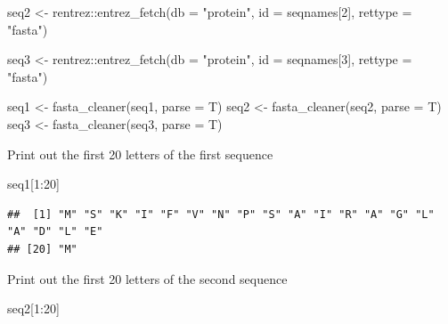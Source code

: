 \documentclass[
]{book}
\newenvironment{Shaded}{\begin{snugshade}}{\end{snugshade}}
\newcommand{\AttributeTok}[1]{\textcolor[rgb]{0.77,0.63,0.00}{#1}}
\newcommand{\DecValTok}[1]{\textcolor[rgb]{0.00,0.00,0.81}{#1}}
\newcommand{\FunctionTok}[1]{\textcolor[rgb]{0.00,0.00,0.00}{#1}}
\newcommand{\NormalTok}[1]{#1}
\newcommand{\OtherTok}[1]{\textcolor[rgb]{0.56,0.35,0.01}{#1}}
\newcommand{\SpecialCharTok}[1]{\textcolor[rgb]{0.00,0.00,0.00}{#1}}
\newcommand{\StringTok}[1]{\textcolor[rgb]{0.31,0.60,0.02}{#1}}
\begin{document}
\begin{Shaded}
\begin{Highlighting}[]
\NormalTok{seq2 }\OtherTok{\textless{}{-}}\NormalTok{ rentrez}\SpecialCharTok{::}\FunctionTok{entrez\_fetch}\NormalTok{(}\AttributeTok{db =} \StringTok{"protein"}\NormalTok{, }
                          \AttributeTok{id =}\NormalTok{ seqnames[}\DecValTok{2}\NormalTok{], }
                          \AttributeTok{rettype =} \StringTok{"fasta"}\NormalTok{) }

\NormalTok{seq3 }\OtherTok{\textless{}{-}}\NormalTok{ rentrez}\SpecialCharTok{::}\FunctionTok{entrez\_fetch}\NormalTok{(}\AttributeTok{db =} \StringTok{"protein"}\NormalTok{, }
                          \AttributeTok{id =}\NormalTok{ seqnames[}\DecValTok{3}\NormalTok{], }
                          \AttributeTok{rettype =} \StringTok{"fasta"}\NormalTok{)}
\end{Highlighting}
\end{Shaded}

\begin{Shaded}
\begin{Highlighting}[]
\NormalTok{seq1 }\OtherTok{\textless{}{-}} \FunctionTok{fasta\_cleaner}\NormalTok{(seq1, }\AttributeTok{parse =}\NormalTok{ T)  }
\NormalTok{seq2 }\OtherTok{\textless{}{-}} \FunctionTok{fasta\_cleaner}\NormalTok{(seq2, }\AttributeTok{parse =}\NormalTok{ T)  }
\NormalTok{seq3 }\OtherTok{\textless{}{-}} \FunctionTok{fasta\_cleaner}\NormalTok{(seq3, }\AttributeTok{parse =}\NormalTok{ T)  }
\end{Highlighting}
\end{Shaded}

Print out the first 20 letters of the first sequence

\begin{Shaded}
\begin{Highlighting}[]
\NormalTok{seq1[}\DecValTok{1}\SpecialCharTok{:}\DecValTok{20}\NormalTok{]                                   }
\end{Highlighting}
\end{Shaded}

\begin{verbatim}
##  [1] "M" "S" "K" "I" "F" "V" "N" "P" "S" "A" "I" "R" "A" "G" "L" "A" "D" "L" "E"
## [20] "M"
\end{verbatim}

Print out the first 20 letters of the second sequence

\begin{Shaded}
\begin{Highlighting}[]
\NormalTok{seq2[}\DecValTok{1}\SpecialCharTok{:}\DecValTok{20}\NormalTok{]                                   }
\end{Highlighting}
\end{Shaded}
\end{document}

